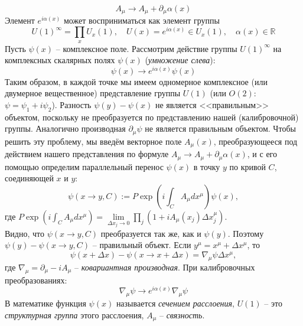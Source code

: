 \documentclass[12pt]{article}
\theoremstyle{definition}
\begin{document}
\begin{equation}
    A_\mu\rightarrow A_\mu+\partial_\mu \alpha(x)
\end{equation}
Элемент $e^{i\alpha(x)}$ может восприниматься как элемент группы
\begin{equation}
    U(1)^\infty=\prod\limits_xU_x(1),\quad U(x)=e^{i\alpha(x)}\in U_x(1),\quad \alpha(x)\in\mathbb{R}
\end{equation}
Пусть $\psi(x)$ -- комплексное поле. Рассмотрим действие группы $U(1)^\infty$ на комплексных скалярных полях $\psi(x)$ (\textit{умножение слева}):
\begin{equation}
    \psi(x)\rightarrow e^{i\alpha(x)}\psi(x)
\end{equation}
Таким образом, в каждой точке мы имеем одномерное комплексное (или двумерное вещественное) представление группы $U(1)$ (или $O(2)$: $\psi = \psi_1 + i\psi_2$). Разность $\psi(y)-\psi(x)$ не является <<правильным>> объектом, поскольку не преобразуется по представлению нашей (калибровочной) группы. Аналогично производная $\partial_\mu\psi$ не является правильным объектом. Чтобы решить эту проблему, мы введём векторное поле $A_\mu(x)$, преобразующееся под действием нашего представления по формуле $A_\mu\rightarrow A_\mu+\partial_\mu\alpha(x)$, и с его помощью определим параллельный
перенос $\psi(x)$ в точку $y$ по кривой $C$, соединяющей $x$ и $y$:
\begin{equation}
    \psi(x\rightarrow y,C):=P\exp\left(i\int_CA_\mu dx^\mu\right)\psi(x),
\end{equation}
где $P\exp\left(i\int_CA_\mu dx^\mu\right)=\lim\limits_{\Delta x_j\rightarrow0}\prod\limits_j(1+iA_\mu(x_j) \Delta x_j^\mu)$.\\
Видно, что $\psi(x\rightarrow y,C)$ преобразуется так же, как и $\psi(y)$. Поэтому $\psi(y)-\psi(x\rightarrow y,C)$ -- правильный объект. Если $y^\mu=x^\mu+\Delta x^\mu$, то
\begin{equation}
    \psi(x+\Delta x)-\psi(x\rightarrow x+\Delta x)=\nabla_\mu\psi\Delta x^\mu,
\end{equation}
где $\nabla_\mu=\partial_\mu-iA_\mu$ -- \textit{ковариантная производная}. При калибровочных преобразованиях:
\begin{equation}
    \nabla_\mu\psi\rightarrow e^{i\alpha(x)}\nabla_\mu\psi
\end{equation}
В математике функция $\psi(x)$ называется \textit{сечением расслоения}, $U(1)$ -- это \textit{структурная группа} этого расслоения, $A_\mu$ -- \textit{связность}.\\
\end{document}
